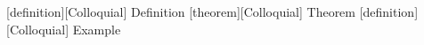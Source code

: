 \usepackage{amsmath}
[definition]{[Colloquial] Definition}{\bfseries}{\itshape}
[theorem]{[Colloquial] Theorem}{\bfseries}{\itshape}
[definition]{[Colloquial] Example}{\bfseries}{\itshape}